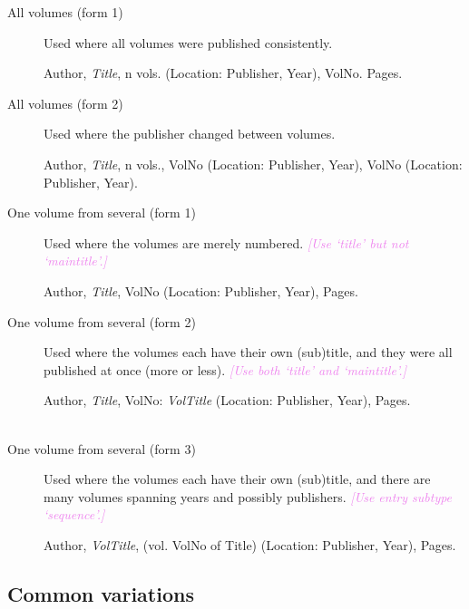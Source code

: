 \documentclass[extrafontsizes,11pt,a4paper,oneside]{memoir}
\newcommand*{\lit}[1]{\textsf{#1}}
\newcommand*{\code}[1]{`\textsf{#1}'}
\newcommand*{\aside}[1]{\textcolor{violet}{\emph{[#1]}}}
\begin{document}
    \begin{description}
        \item[All volumes (form 1)] Used where all volumes were published consistently.
        \par Author, \emph{Title}, n \lit{vols.} (Location: Publisher, Year), VolNo. Pages.
        \\
        
        \item[All volumes (form 2)] Used where the publisher changed between volumes.
        \par Author, \emph{Title}, n \lit{vols.}, VolNo (Location: Publisher, Year), VolNo (Location: Publisher, Year).
        \\
        
        \item[One volume from several (form 1)] Used where the volumes are merely numbered. \aside{Use \code{title} but not \code{maintitle}.}
        \par Author, \emph{Title}, VolNo (Location: Publisher, Year), Pages.
        \\
        
        \item[One volume from several (form 2)] Used where the volumes each have their own (sub)title, and they were all published at once (more or less). \aside{Use both \code{title} and \code{maintitle}.}
        \par Author, \emph{Title}, VolNo: \emph{VolTitle} (Location: Publisher, Year), Pages.
        \\
        \\
        
        \item[One volume from several (form 3)] Used where the volumes each have their own (sub)title, and there are many volumes spanning years and possibly publishers. \aside{Use entry subtype \code{sequence}.}
        \par Author, \emph{VolTitle}, (\lit{vol.} VolNo \lit{of} Title) (Location: Publisher, Year), Pages.
        \\
    \end{description}
    
    \subsection{Common variations}
    
\end{document}
